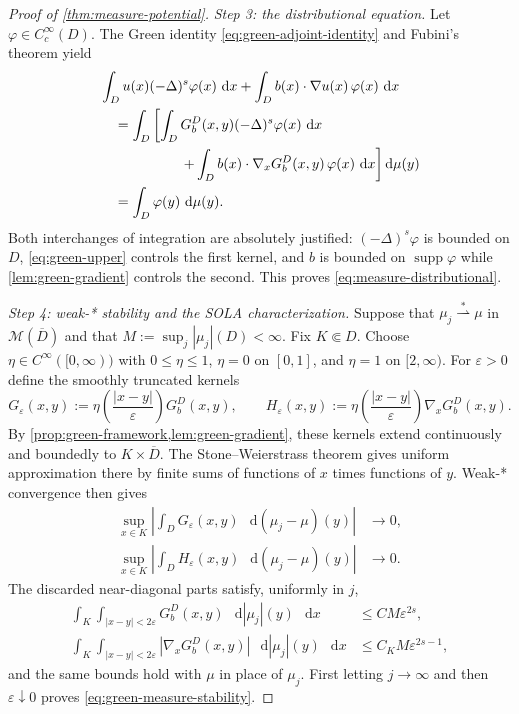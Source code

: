 \documentclass[reqno]{amsart}
\numberwithin{equation}{section}
\theoremstyle{plain}
\theoremstyle{definition}
\theoremstyle{remark}
\newcommand{\M}{\mathcal M}
\newcommand{\differential}{\mathop{}\!\mathrm d}
\begin{document}
\begin{proof}[Proof of \cref{thm:measure-potential}]
\emph{Step 3: the distributional equation.}
Let $\varphi\in C_c^\infty(D)$.  The Green identity
\eqref{eq:green-adjoint-identity} and Fubini's theorem yield
\begin{align*}
 &\int_Du(x)(-\Delta)^s\varphi(x)\,\differential x
 +\int_Db(x)\cdot\nabla u(x)\,\varphi(x)\,\differential x\\
 &\quad=\int_D\left[\int_DG_b^D(x,y)(-\Delta)^s\varphi(x)
   \,\differential x\right.\\
 &\hspace{5.7em}\left.
   +\int_Db(x)\cdot\nabla_xG_b^D(x,y)\,\varphi(x)
   \,\differential x\right]\differential\mu(y)\\
 &\quad=\int_D\varphi(y)\,\differential\mu(y).
\end{align*}
Both interchanges of integration are absolutely justified:
$(-\Delta)^s\varphi$ is bounded on $D$, \eqref{eq:green-upper} controls
the first kernel, and $b$ is bounded on $\operatorname{supp}\varphi$ while
\cref{lem:green-gradient} controls the second.  This proves
\eqref{eq:measure-distributional}.

\emph{Step 4: weak-* stability and the SOLA characterization.}
Suppose that $\mu_j\stackrel{*}{\rightharpoonup}\mu$ in
$\M(\overline D)$ and that
$M:=\sup_j|\mu_j|(D)<\infty$.  Fix $K\Subset D$.  Choose
$\eta\in C^\infty([0,\infty))$ with $0\le\eta\le1$,
$\eta=0$ on $[0,1]$, and $\eta=1$ on $[2,\infty)$.  For
$\varepsilon>0$ define the smoothly truncated kernels
\[
 G_\varepsilon(x,y)
 :=\eta\!\left(\frac{|x-y|}{\varepsilon}\right)G_b^D(x,y),
 \qquad
 H_\varepsilon(x,y)
 :=\eta\!\left(\frac{|x-y|}{\varepsilon}\right)
   \nabla_xG_b^D(x,y).
\]
By \cref{prop:green-framework,lem:green-gradient}, these kernels extend
continuously and boundedly to $K\times\overline D$.  The
Stone--Weierstrass theorem gives uniform approximation there by finite sums
of functions of $x$ times functions of $y$.  Weak-* convergence then gives
\begin{align*}
 \sup_{x\in K}\left|
  \int_DG_\varepsilon(x,y)\,\differential(\mu_j-\mu)(y)
 \right|&\longrightarrow0,\\
 \sup_{x\in K}\left|
  \int_DH_\varepsilon(x,y)\,\differential(\mu_j-\mu)(y)
 \right|&\longrightarrow0.
\end{align*}
The discarded near-diagonal parts satisfy, uniformly in $j$,
\begin{align*}
 \int_K\int_{|x-y|<2\varepsilon}G_b^D(x,y)
  \,\differential|\mu_j|(y)\,\differential x
 &\le C M\varepsilon^{2s},\\
 \int_K\int_{|x-y|<2\varepsilon}|\nabla_xG_b^D(x,y)|
  \,\differential|\mu_j|(y)\,\differential x
 &\le C_K M\varepsilon^{2s-1},
\end{align*}
and the same bounds hold with $\mu$ in place of $\mu_j$.  First letting
$j\to\infty$ and then $\varepsilon\downarrow0$ proves
\eqref{eq:green-measure-stability}.


\end{proof}
\end{document}

